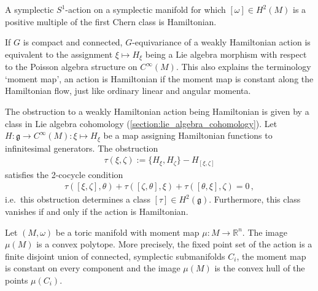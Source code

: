     \begin{property}
        A symplectic $S^1$-action on a symplectic manifold for which $[\omega]\in H^2(M)$ is a positive multiple of the first Chern class is Hamiltonian.
    \end{property}

    \begin{property}[Obstruction]
        If $G$ is compact and connected, $G$-equivariance of a weakly Hamiltonian action is equivalent to the assignment $\xi\mapsto H_\xi$ being a Lie algebra morphism with respect to the Poisson algebra structure on $C^\infty(M)$. This also explains the terminology `moment map', an action is Hamiltonian if the moment map is constant along the Hamiltonian flow, just like ordinary linear and angular momenta.

        The obstruction to a weakly Hamiltonian action being Hamiltonian is given by a class in Lie algebra cohomology (\cref{section:lie_algebra_cohomology}). Let $H:\mathfrak{g}\rightarrow C^\infty(M):\xi\mapsto H_\xi$ be a map assigning Hamiltonian functions to infinitesimal generators. The obstruction
        \begin{gather}
            \tau(\xi,\zeta) := \{H_\xi,H_\zeta\} - H_{[\xi,\zeta]}
        \end{gather}
        satisfies the 2-cocycle condition
        \begin{gather}
            \tau([\xi,\zeta],\theta) + \tau([\zeta,\theta],\xi) + \tau([\theta,\xi],\zeta) = 0\,,
        \end{gather}
        i.e.~this obstruction determines a class $[\tau]\in H^2(\mathfrak{g})$. Furthermore, this class vanishes if and only if the action is Hamiltonian.
    \end{property}

    \begin{theorem}
        Let $(M,\omega)$ be a toric manifold with moment map $\mu:M\rightarrow\mathbb{R}^n$. The image $\mu(M)$ is a convex polytope. More precisely, the fixed point set of the action is a finite disjoint union of connected, symplectic submanifolds $C_i$, the moment map is constant on every component and the image $\mu(M)$ is the convex hull of the points $\mu(C_i)$.
    \end{theorem}

